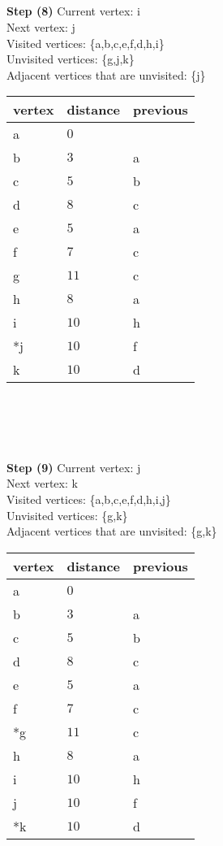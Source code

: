 \documentclass[11pt]{article}
\begin{document}
\\ \\
\\ \\
\textbf{Step (8)} Current vertex: i\\
Next vertex: j\\
Visited vertices: \{a,b,c,e,f,d,h,i\}\\
Unvisited vertices: \{g,j,k\}\\
Adjacent vertices that are unvisited: \{j\}\\
\begin{tabular}{|l|l|l|}
    \hline
    vertex & distance & previous \\
    \hline
    a & $0$ &  \\
    \hline
    b & $3$ & a \\
    \hline
    c & $5$ & b \\
    \hline
    d & $8$ & c \\
    \hline
    e & $5$ & a \\
    \hline
    f & $7$ & c \\
    \hline
    g & $11$ & c \\
    \hline
    h & $8$ & a \\
    \hline
    i & $10$ & h \\
    \hline
    *j & $10$ & f \\
    \hline
    k & $10$ & d \\
    \hline
\end{tabular}
\\ \\
\\ \\
\textbf{Step (9)} Current vertex: j\\
Next vertex: k\\
Visited vertices: \{a,b,c,e,f,d,h,i,j\}\\
Unvisited vertices: \{g,k\}\\
Adjacent vertices that are unvisited: \{g,k\}\\
\begin{tabular}{|l|l|l|}
    \hline
    vertex & distance & previous \\
    \hline
    a & $0$ &  \\
    \hline
    b & $3$ & a \\
    \hline
    c & $5$ & b \\
    \hline
    d & $8$ & c \\
    \hline
    e & $5$ & a \\
    \hline
    f & $7$ & c \\
    \hline
    *g & $11$ & c \\
    \hline
    h & $8$ & a \\
    \hline
    i & $10$ & h \\
    \hline
    j & $10$ & f \\
    \hline
    *k & $10$ & d \\
    \hline
\end{tabular}
\end{document}
